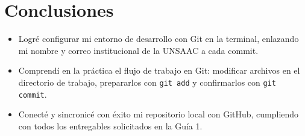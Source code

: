 \documentclass[11pt,a4paper]{article}
\begin{document}
\section{Conclusiones}
\begin{itemize}
    \item Logré configurar mi entorno de desarrollo con Git en la terminal, enlazando mi nombre y correo institucional de la UNSAAC a cada commit.
    \item Comprendí en la práctica el flujo de trabajo en Git: modificar archivos en el directorio de trabajo, prepararlos con \texttt{git add} y confirmarlos con \texttt{git commit}.
    \item Conecté y sincronicé con éxito mi repositorio local con GitHub, cumpliendo con todos los entregables solicitados en la Guía 1.
\end{itemize}
\end{document}
